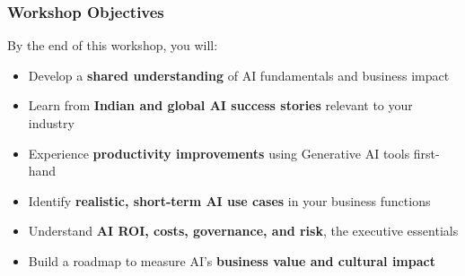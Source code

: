 \begin{frame}[fragile]\frametitle{Workshop Objectives}

By the end of this workshop, you will:
\begin{itemize}
  \item Develop a \textbf{shared understanding} of AI fundamentals and business impact
  \item Learn from \textbf{Indian and global AI success stories} relevant to your industry
  \item Experience \textbf{productivity improvements} using Generative AI tools first-hand
  \item Identify \textbf{realistic, short-term AI use cases} in your business functions
  \item Understand \textbf{AI ROI, costs, governance, and risk}, the executive essentials
  \item Build a roadmap to measure AI's \textbf{business value and cultural impact}
\end{itemize}

\end{frame}


